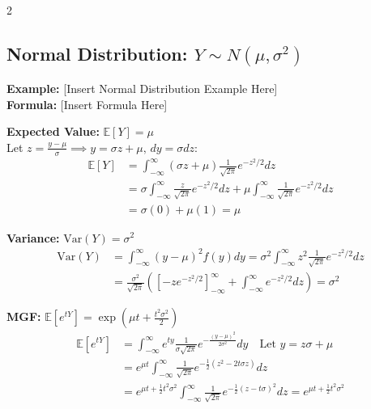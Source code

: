 \documentclass[11pt, letterpaper]{article}
\theoremstyle{definition}
\theoremstyle{remark}
\newcommand{\E}{\mathbb{E}}
\begin{document}
\begin{multicols*}{2}
\subsection{Normal Distribution: $Y \sim N(\mu, \sigma^2)$}
\textbf{Example:} [Insert Normal Distribution Example Here] \\
\textbf{Formula:} [Insert Formula Here]

\begin{center}
\end{center}

\textbf{Expected Value:} $\E[Y] = \mu$ \\
Let $z = \frac{y-\mu}{\sigma} \implies y = \sigma z + \mu, \, dy = \sigma dz$:
\begin{align*}
\E[Y] &= \int_{-\infty}^{\infty} (\sigma z + \mu) \frac{1}{\sqrt{2\pi}} e^{-z^2/2} dz \\
&= \sigma \int_{-\infty}^{\infty} \frac{z}{\sqrt{2\pi}} e^{-z^2/2} dz + \mu \int_{-\infty}^{\infty} \frac{1}{\sqrt{2\pi}} e^{-z^2/2} dz \\
&= \sigma(0) + \mu(1) = \mu
\end{align*}

\textbf{Variance:} $\text{Var}(Y) = \sigma^2$
\begin{align*}
\text{Var}(Y) &= \int_{-\infty}^{\infty} (y-\mu)^2 f(y) dy = \sigma^2 \int_{-\infty}^{\infty} z^2 \frac{1}{\sqrt{2\pi}} e^{-z^2/2} dz \\
&= \frac{\sigma^2}{\sqrt{2\pi}} \left( \left[-z e^{-z^2/2}\right]_{-\infty}^{\infty} + \int_{-\infty}^{\infty} e^{-z^2/2} dz \right) = \sigma^2
\end{align*}

\textbf{MGF:} $\E[e^{tY}] = \exp\left(\mu t + \frac{t^2\sigma^2}{2}\right)$
\begin{align*}
\E[e^{tY}] &= \int_{-\infty}^{\infty} e^{ty} \frac{1}{\sigma\sqrt{2\pi}} e^{-\frac{(y-\mu)^2}{2\sigma^2}} dy \quad \text{Let } y = z\sigma + \mu \\
&= e^{\mu t} \int_{-\infty}^{\infty} \frac{1}{\sqrt{2\pi}} e^{-\frac{1}{2}(z^2 - 2t\sigma z)} dz \\
&= e^{\mu t + \frac{1}{2}t^2\sigma^2} \int_{-\infty}^{\infty} \frac{1}{\sqrt{2\pi}} e^{-\frac{1}{2}(z - t\sigma)^2} dz = e^{\mu t + \frac{1}{2}t^2\sigma^2}
\end{align*}


\end{multicols*}
\end{document}
